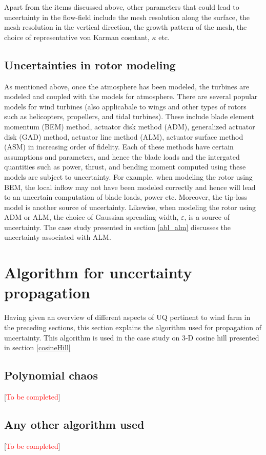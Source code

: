 \documentclass[]{aiaa-tc}%
\begin{document}
Apart from the items discussed above, other parameters that could lead to uncertainty in the flow-field include the mesh resolution along the surface, the mesh resolution in the vertical direction, the growth pattern of the mesh, the choice of representative von Karman cosntant, $\kappa$ etc.
 
\subsection{Uncertainties in rotor modeling}
As mentioned above, once the atmosphere has been modeled, the turbines are modeled and coupled with the models for atmosphere. There are several popular models for wind turbines (also applicabale to wings and other types of rotors such as helicopters, propellers, and tidal turbines). These include blade element momentum (BEM) method, actuator disk method (ADM), generalized actuator disk (GAD) method, actuator line method (ALM), actuator surface method (ASM) in increasing order of fidelity. Each of these methods have certain assumptions and parameters, and hence the blade loads and the intergated quantities such as power, thrust, and bending moment computed using these models are subject to uncertainty. For example, when modeling the rotor using BEM, the local inflow may not have been modeled correctly and hence will lead to an uncertain computation of blade loads, power etc. Moreover, the tip-loss model is another source of uncertainty. Likewise, when modeling the rotor using ADM or ALM, the choice of Gaussian spreading width, $\varepsilon$, is a source of uncertainty. The case study presented in section \ref{abl_alm} discusses the uncertainty associated with ALM.


\section{Algorithm for uncertainty propagation} \label{uq_algo}
Having given an overview of different aspects of UQ pertinent to wind farm in the preceding sections, this section explains the algorithm used for propagation of uncertainty. This algorithm is used in the case study on 3-D cosine hill presented in section \ref{cosineHill}

\subsection{Polynomial chaos}
 [\textcolor{red}{To be completed}]

\subsection{Any other algorithm used} 
[\textcolor{red}{To be completed}]
\end{document}
